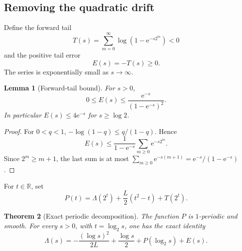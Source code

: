 \documentclass[11pt,oneside]{article}
\newtheorem{theorem}{Theorem}[section]
\newtheorem{lemma}[theorem]{Lemma}
\theoremstyle{definition}
\theoremstyle{remark}
\newcommand{\R}{\mathbb R}
\newcommand{\e}{\mathrm e}
\begin{document}
\subsection{Removing the quadratic drift}

Define the forward tail
\begin{equation}
 T(s)=\sum_{m=0}^{\infty}\log(1-\e^{-s2^m})<0             \label{eq:forward-tail}
\end{equation}
and the positive tail error
\begin{equation}
 E(s)=-T(s)\ge0.                                           \label{eq:tail-error}
\end{equation}
The series is exponentially small as $s\to\infty$.

\begin{lemma}[Forward-tail bound]
For $s>0$,
\begin{equation}
 0\le E(s)\le\frac{\e^{-s}}{(1-\e^{-s})^2}.               \label{eq:tail-bound}
\end{equation}
In particular $E(s)\le4\e^{-s}$ for $s\ge\log2$.
\end{lemma}

\begin{proof}
For $0<q<1$, $-\log(1-q)\le q/(1-q)$.  Hence
\begin{equation*}
 E(s)\le\frac1{1-\e^{-s}}
 \sum_{m\ge0}\e^{-s2^m}.
\end{equation*}
Since $2^m\ge m+1$, the last sum is at most
$\sum_{m\ge0}\e^{-s(m+1)}=\e^{-s}/(1-\e^{-s})$.
\end{proof}

For $t\in\R$, set
\begin{equation}
 P(t)=\Lambda(2^t)+\frac L2(t^2-t)+T(2^t).                 \label{eq:P-def}
\end{equation}

\begin{theorem}[Exact periodic decomposition]
The function $P$ is $1$-periodic and smooth.  For every $s>0$, with
$t=\log_2s$, one has the exact identity
\begin{equation}
 \boxed{
 \Lambda(s)=-\frac{(\log s)^2}{2L}+\frac{\log s}{2}
             +P(\log_2s)+E(s).}                           \label{eq:Lambda-exact-periodic}
\end{equation}
\end{theorem}
\end{document}
